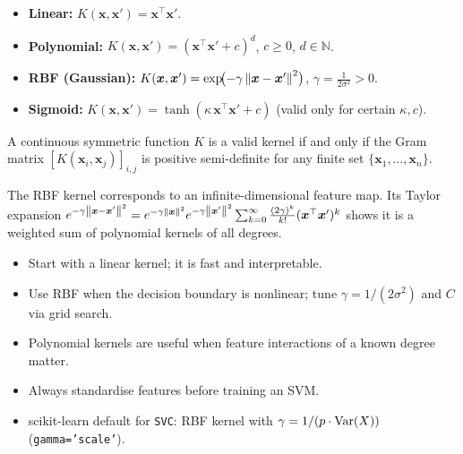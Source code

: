 \begin{example}
\begin{itemize}
    \item \textbf{Linear:} $K(\bm{x},\bm{x}') = \bm{x}^\top\bm{x}'$.
    \item \textbf{Polynomial:} $K(\bm{x},\bm{x}') = (\bm{x}^\top\bm{x}' + c)^d$, $c \geq 0$, $d \in \mathbb{N}$.
    \item \textbf{RBF (Gaussian):} $K(\bm{x},\bm{x}') = \exp\!\bigl(-\gamma\left\| \bm{x}-\bm{x}' \right\|^2\bigr)$, $\gamma = \frac{1}{2\sigma^2} > 0$.
    \item \textbf{Sigmoid:} $K(\bm{x},\bm{x}') = \tanh(\kappa\,\bm{x}^\top\bm{x}' + c)$ (valid only for certain $\kappa, c$).
\end{itemize}
\end{example}

\begin{lemma}
A continuous symmetric function $K$ is a valid kernel if and only if the Gram matrix $[K(\bm{x}_i,\bm{x}_j)]_{i,j}$ is positive semi-definite for any finite set $\{\bm{x}_1,\ldots,\bm{x}_n\}$.
\end{lemma}

\begin{proposition}
The RBF kernel corresponds to an infinite-dimensional feature map. Its Taylor expansion $e^{-\gamma\left\| \bm{x}-\bm{x}' \right\|^2} = e^{-\gamma\left\| \bm{x} \right\|^2}e^{-\gamma\left\| \bm{x}' \right\|^2}\sum_{k=0}^{\infty}\frac{(2\gamma)^k}{k!}(\bm{x}^\top\bm{x}')^k$ shows it is a weighted sum of polynomial kernels of all degrees.
\end{proposition}

\begin{bestpractice}[title=\textbf{Choosing the Kernel}]
\begin{itemize}
    \item Start with a linear kernel; it is fast and interpretable.
    \item Use RBF when the decision boundary is nonlinear; tune $\gamma = 1/(2\sigma^2)$ and $C$ via grid search.
    \item Polynomial kernels are useful when feature interactions of a known degree matter.
    \item Always standardise features before training an SVM.
    \item scikit-learn default for \texttt{SVC}: RBF kernel with $\gamma = 1/(p\cdot\mathrm{Var}(X))$ (\texttt{gamma='scale'}).
\end{itemize}
\end{bestpractice}

